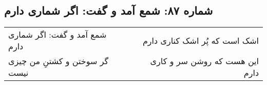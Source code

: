 \begin{center}
\section*{شماره ۸۷: شمع آمد و گفت: اگر شماری دارم}
\label{sec:087}
\begin{longtable}{l p{0.5cm} r}
شمع آمد و گفت: اگر شماری دارم
&&
اشک است که پُر اشک کناری دارم
\\
گر سوختن و کشتنِ من چیزی نیست
&&
این هست که روشن سر و کاری دارم
\\
\end{longtable}
\end{center}
